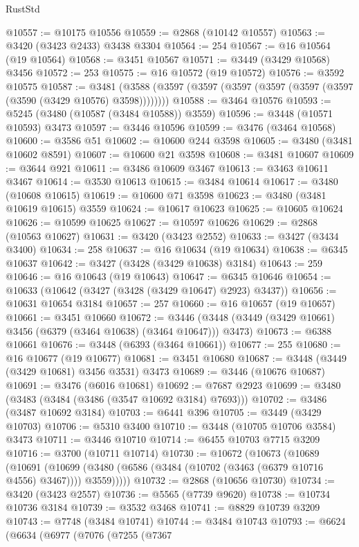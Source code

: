 \begin{lexlean}{RustStd}
\begin{coremodule}
{\begin{coremodule}
{{{{{{{{{{{{{{{{{{{{{{{{{{{{{{{{{{{{{{{{{{{{{{{{{{{{{{{{{{{{{{{{{{{{{{{{{{{{{{{{{{{{{@10557 := @10175 @10556
@10559 := @2868 (@10142 @10557)
@10563 := @3420 (@3423 @2433) @3438 @3304
@10564 := 254
@10567 := @16 @10564 (@19 @10564)
@10568 := @3451 @10567
@10571 := @3449 (@3429 @10568) @3456
@10572 := 253
@10575 := @16 @10572 (@19 @10572)
@10576 := @3592 @10575
@10587 := @3481 (@3588 (@3597 (@3597 (@3597 (@3597 (@3597 (@3597 (@3590 (@3429 @10576) @3598))))))))
@10588 := @3464 @10576
@10593 := @5245 (@3480 (@10587 (@3484 @10588)) @3559)
@10596 := @3448 (@10571 @10593) @3473
@10597 := @3446 @10596
@10599 := @3476 (@3464 @10568)
@10600 := @3586 @51
@10602 := @10600 @244 @3598
@10605 := @3480 (@3481 @10602 @8591)
@10607 := @10600 @21 @3598
@10608 := @3481 @10607
@10609 := @3644 @921
@10611 := @3486 @10609 @3467
@10613 := @3463 @10611 @3467
@10614 := @3530 @10613
@10615 := @3484 @10614
@10617 := @3480 (@10608 @10615)
@10619 := @10600 @71 @3598
@10623 := @3480 (@3481 @10619 @10615) @3559
@10624 := @10617 @10623
@10625 := @10605 @10624
@10626 := @10599 @10625
@10627 := @10597 @10626
@10629 := @2868 (@10563 @10627)
@10631 := @3420 (@3423 @2552)
@10633 := @3427 (@3434 @3400)
@10634 := 258
@10637 := @16 @10634 (@19 @10634)
@10638 := @6345 @10637
@10642 := @3427 (@3428 (@3429 @10638) @3184)
@10643 := 259
@10646 := @16 @10643 (@19 @10643)
@10647 := @6345 @10646
@10654 := @10633 (@10642 (@3427 (@3428 (@3429 @10647) @2923) @3437))
@10656 := @10631 @10654 @3184
@10657 := 257
@10660 := @16 @10657 (@19 @10657)
@10661 := @3451 @10660
@10672 := @3446 (@3448 (@3449 (@3429 @10661) @3456 (@6379 (@3464 @10638) (@3464 @10647))) @3473)
@10673 := @6388 @10661
@10676 := @3448 (@6393 (@3464 @10661))
@10677 := 255
@10680 := @16 @10677 (@19 @10677)
@10681 := @3451 @10680
@10687 := @3448 (@3449 (@3429 @10681) @3456 @3531) @3473
@10689 := @3446 (@10676 @10687)
@10691 := @3476 (@6016 @10681)
@10692 := @7687 @2923
@10699 := @3480 (@3483 (@3484 (@3486 (@3547 @10692 @3184) @7693)))
@10702 := @3486 (@3487 @10692 @3184)
@10703 := @6441 @396
@10705 := @3449 (@3429 @10703)
@10706 := @5310 @3400
@10710 := @3448 (@10705 @10706 @3584) @3473
@10711 := @3446 @10710
@10714 := @6455 @10703 @7715 @3209
@10716 := @3700 (@10711 @10714)
@10730 := @10672
    (@10673
      (@10689
        (@10691
          (@10699 (@3480 (@6586 (@3484 (@10702 (@3463 (@6379 @10716 @4556) @3467)))) @3559)))))
@10732 := @2868 (@10656 @10730)
@10734 := @3420 (@3423 @2557)
@10736 := @5565 (@7739 @9620)
@10738 := @10734 @10736 @3184
@10739 := @3532 @3468
@10741 := @8829 @10739 @3209
@10743 := @7748 (@3484 @10741)
@10744 := @3484 @10743
@10793 := @6624
    (@6634
      (@6977
        (@7076
          (@7255
            (@7367
}}}}}}}}}}}}}}}}}}}}}}}}}}}}}}}}}}}}}}}}}}}}}}}}}}}}}}}}}}}}}}}}}}}}}}}}}}}}}}}}}}}}}
\end{coremodule}}
\end{coremodule}
\end{lexlean}
